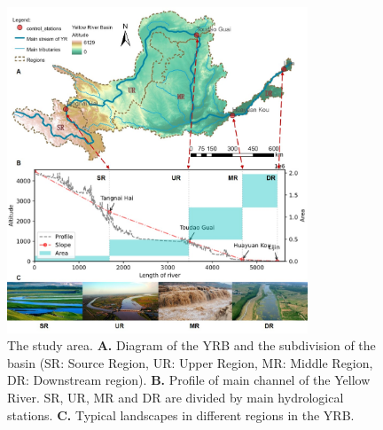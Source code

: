 \documentclass[9pt,twoside,lineno]{pnas-new}
\begin{document}

\begin{figure}
    \centering
    \includegraphics[width=0.8\textwidth]{../../figures/sup/s1_study_area.jpg}
    \caption{
        The study area.
        \textbf{A.} Diagram of the YRB and the subdivision of the basin (SR: Source Region, UR: Upper Region, MR: Middle Region, DR: Downstream region).
        \textbf{B.} Profile of main channel of the Yellow River. SR, UR, MR and DR are divided by main hydrological stations.
        \textbf{C.} Typical landscapes in different regions in the YRB.
    }
\end{figure}
\end{document}
